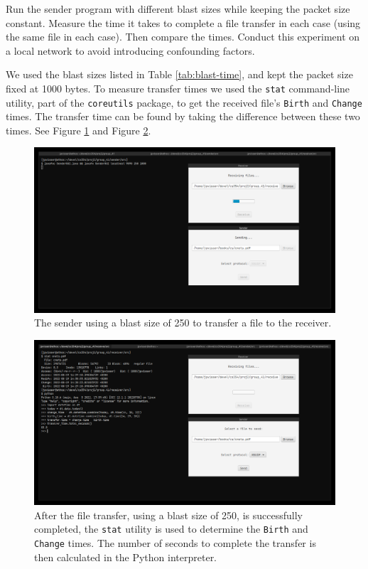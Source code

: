 \documentclass[10pt, a4paper]{article}
\begin{document}
Run the sender program with different blast sizes while keeping the packet size
constant. Measure the time it takes to complete a file transfer in each case
(using the same file in each case). Then compare the times. Conduct this
experiment on a local network to avoid introducing confounding factors.

We used the blast sizes listed in Table \ref{tab:blast-time}, and kept the
packet size fixed at 1000 bytes. To measure transfer times we used the
\texttt{stat} command-line utility, part of the \texttt{coreutils} package, to
get the received file's \texttt{Birth} and \texttt{Change} times. The transfer
time can be found by taking the difference between these two times. See Figure
\ref{fig:exp2-1} and Figure \ref{fig:exp2-2}.

\begin{figure}
  \centering
  \includegraphics[width=12cm]{exp2-1}
  \caption{The sender using a blast size of 250 to transfer a file to the
  receiver.}
  \label{fig:exp2-1}
\end{figure}

\begin{figure}
  \centering
  \includegraphics[width=12cm]{exp2-2}
  \caption{After the file transfer, using a blast size of 250, is successfully
  completed, the \texttt{stat} utility is used to determine the \texttt{Birth}
  and \texttt{Change} times. The number of seconds to complete the transfer is
  then calculated in the Python interpreter.}
  \label{fig:exp2-2}
\end{figure}
\end{document}
